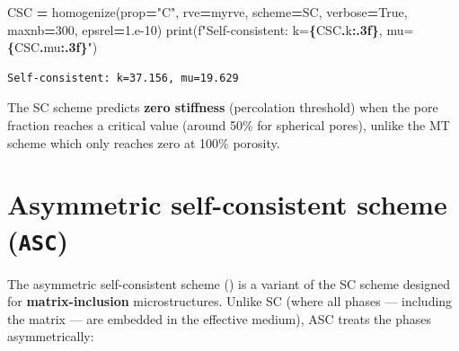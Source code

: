 \documentclass[
  a4paper,
  numbers=noendperiod,
  DIV=12]{scrreprt}
\newenvironment{Shaded}{\begin{snugshade}}{\end{snugshade}}
\newcommand{\BuiltInTok}[1]{#1}
\newcommand{\DecValTok}[1]{\textcolor[rgb]{0.00,0.00,0.81}{#1}}
\newcommand{\FloatTok}[1]{\textcolor[rgb]{0.00,0.00,0.81}{#1}}
\newcommand{\NormalTok}[1]{#1}
\newcommand{\OperatorTok}[1]{\textcolor[rgb]{0.81,0.36,0.00}{\textbf{#1}}}
\newcommand{\SpecialCharTok}[1]{\textcolor[rgb]{0.81,0.36,0.00}{\textbf{#1}}}
\newcommand{\SpecialStringTok}[1]{\textcolor[rgb]{0.31,0.60,0.02}{#1}}
\newcommand{\StringTok}[1]{\textcolor[rgb]{0.31,0.60,0.02}{#1}}
\newcommand{\VariableTok}[1]{\textcolor[rgb]{0.00,0.00,0.00}{#1}}
\begin{document}
\begin{Shaded}
\begin{Highlighting}[]
\NormalTok{CSC }\OperatorTok{=}\NormalTok{ homogenize(prop}\OperatorTok{=}\StringTok{"C"}\NormalTok{, rve}\OperatorTok{=}\NormalTok{myrve, scheme}\OperatorTok{=}\NormalTok{SC,}
\NormalTok{                 verbose}\OperatorTok{=}\VariableTok{True}\NormalTok{, maxnb}\OperatorTok{=}\DecValTok{300}\NormalTok{, epsrel}\OperatorTok{=}\FloatTok{1.e{-}10}\NormalTok{)}
\BuiltInTok{print}\NormalTok{(}\SpecialStringTok{f"Self{-}consistent: k=}\SpecialCharTok{\{}\NormalTok{CSC}\SpecialCharTok{.}\NormalTok{k}\SpecialCharTok{:.3f\}}\SpecialStringTok{, mu=}\SpecialCharTok{\{}\NormalTok{CSC}\SpecialCharTok{.}\NormalTok{mu}\SpecialCharTok{:.3f\}}\SpecialStringTok{"}\NormalTok{)}
\end{Highlighting}
\end{Shaded}

\begin{verbatim}
Self-consistent: k=37.156, mu=19.629
\end{verbatim}

\begin{tcolorbox}[enhanced jigsaw, arc=.35mm, bottomrule=.15mm, bottomtitle=1mm, breakable, colback=white, colbacktitle=quarto-callout-note-color!10!white, colframe=quarto-callout-note-color-frame, coltitle=black, left=2mm, leftrule=.75mm, opacityback=0, opacitybacktitle=0.6, rightrule=.15mm, title=\textcolor{quarto-callout-note-color}{\faInfo}\hspace{0.5em}{Note}, titlerule=0mm, toprule=.15mm, toptitle=1mm]

The SC scheme predicts \textbf{zero stiffness} (percolation threshold)
when the pore fraction reaches a critical value (around 50\% for
spherical pores), unlike the MT scheme which only reaches zero at 100\%
porosity.

\end{tcolorbox}

\section{\texorpdfstring{Asymmetric self-consistent scheme
(\texttt{ASC})}{Asymmetric self-consistent scheme (ASC)}}\label{sec-ASC}

The asymmetric self-consistent scheme () is a variant of the SC scheme designed for
\textbf{matrix-inclusion} microstructures. Unlike SC (where all phases
--- including the matrix --- are embedded in the effective medium), ASC
treats the phases asymmetrically:
\end{document}
